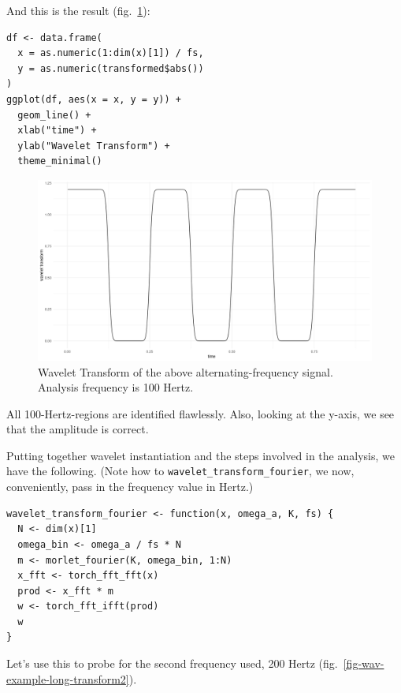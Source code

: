\documentclass[
  letterpaper,
]{krantz}
\begin{document}
And this is the result (fig.~\ref{fig-wav-example-long-transform}):

\begin{verbatim}
df <- data.frame(
  x = as.numeric(1:dim(x)[1]) / fs,
  y = as.numeric(transformed$abs())
)
ggplot(df, aes(x = x, y = y)) +
  geom_line() +
  xlab("time") +
  ylab("Wavelet Transform") +
  theme_minimal()
\end{verbatim}

\begin{figure}[H]

{\centering \includegraphics{images/wav-example-long-transform.png}

}

\caption{\label{fig-wav-example-long-transform}Wavelet Transform of the
above alternating-frequency signal. Analysis frequency is 100 Hertz.}

\end{figure}

All 100-Hertz-regions are identified flawlessly. Also, looking at the
y-axis, we see that the amplitude is correct.

Putting together wavelet instantiation and the steps involved in the
analysis, we have the following. (Note how to
\texttt{wavelet\_transform\_fourier}, we now, conveniently, pass in the
frequency value in Hertz.)

\begin{verbatim}
wavelet_transform_fourier <- function(x, omega_a, K, fs) {
  N <- dim(x)[1]
  omega_bin <- omega_a / fs * N
  m <- morlet_fourier(K, omega_bin, 1:N)
  x_fft <- torch_fft_fft(x)
  prod <- x_fft * m
  w <- torch_fft_ifft(prod)
  w
}
\end{verbatim}

Let's use this to probe for the second frequency used, 200 Hertz
(fig.~\ref{fig-wav-example-long-transform2}).
\end{document}
